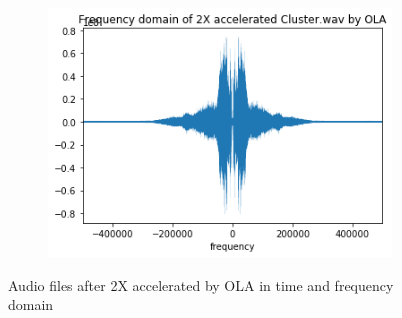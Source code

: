 \documentclass{article}
\begin{document}
\begin{figure}[h!]
\begin{subfigure}{0.45\textwidth}
    \end{subfigure}%
    \begin{subfigure}{0.45\textwidth}
      \includegraphics[width=\textwidth]{Cluster_2X_OLA_freq.png}
    \end{subfigure}
    \caption{Audio files after 2X accelerated by OLA in time and frequency domain}
    \label{fig:mylabel}
\end{figure}
\end{document}
